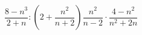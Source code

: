 \begin{ex}[type=expression]
	\begin{condition}
		\( \dfrac{8-n^3}{2+n}:\left( 2+\dfrac{n^2}{n+2} \right) \dfrac{n^2}{n-2}\cdot\dfrac{4-n^2}{n^2+2n}\)
	\end{condition}
\end{ex}